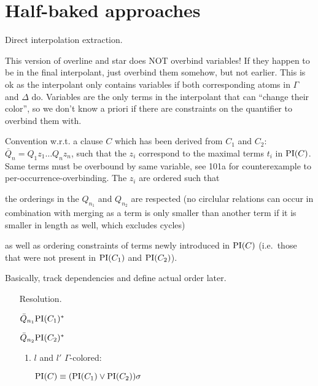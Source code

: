 \section{Half-baked approaches}

\begin{defi}
	Direct interpolation extraction.

	This version of overline and star does NOT overbind variables! If they happen to be in the final interpolant, just overbind them somehow, but not earlier. This is ok as the interpolant only contains variables if both corresponding atoms in $\Gamma$ and $\Delta$ do. Variables are the only terms in the interpolant that can ``change their color'', so we don't know a priori if there are constraints on the quantifier to overbind them with.

	Convention w.r.t. a clause $C$ which has been derived from $C_1$ and $C_2$:
	$\bar Q_n = Q_1 z_1 \ldots Q_n z_n$, such that the $z_i$ correspond to the maximal terms $t_i$ in $\mathrm{PI}(C)$. Same terms must be overbound by same variable, see 101a for counterexample to per-occurrence-overbinding.
	The $z_i$ are ordered such that
	\begin{compactenum}
	\item the orderings in the $Q_{n_1}$ and $Q_{n_2}$ are respected (no circlular relations can occur in combination with merging as a term is only smaller than another term if it is smaller in length as well, which excludes cycles) 
		\item as well as ordering constraints of terms newly introduced in $\mathrm{PI}(C)$ (i.e.~those that were not present in $\mathrm{PI}(C_1)$ and $\mathrm{PI}(C_2)$). 
	\end{compactenum}
	Basically, track dependencies and define actual order later.


	\begin{itemize}
		\item[Resolution.]~
			\begin{prooftree}
			\end{prooftree}

			$\bar Q_{n_1} \mathrm{PI}(C_1)^*$

			$\bar Q_{n_2} \mathrm{PI}(C_2)^* $

			\begin{enumerate}
				\item $l$ and $l'$ $\Gamma$-colored:

					$\mathrm{PI}(C) \equiv (\mathrm{PI}(C_1) \lor \mathrm{PI}(C_2))\sigma $


\end{enumerate}
\end{itemize}
\end{defi}
